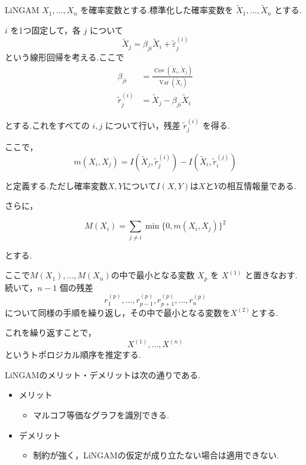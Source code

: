 \documentclass[uplatex, dvipdfmx]{jsarticle}
\begin{document}
\begin{defn}{LiNGAM}
  $X_1,\ldots,X_n$ を確率変数とする.標準化した確率変数を $\tilde X_1, \dots ,\tilde X_n$ とする.

  $i$ を1つ固定して，各 $j$ について
  \[
    \tilde X_j = \beta_{ji} \tilde X_i + \tilde \varepsilon_j^{(i)}
  \]
  という線形回帰を考える.ここで
  \begin{align}
    \beta_{ji} &= \frac{\operatorname{Cov}(\tilde X_i,\tilde X_j)}{\operatorname{Var}(\tilde X_i)} \\
    \tilde r_j^{(i)} &= \tilde X_j - \beta_{ji}\tilde X_i
  \end{align}

  とする.これをすべての $i,j$ について行い，残差 $\tilde r_j^{(i)}$ を得る.

  ここで，
  \[
    m(X_i,X_j) = I(\tilde X_j,\tilde r_j^{(i)}) - I(\tilde X_i,\tilde r_i^{(j)})
  \]

  と定義する.ただし確率変数$X,Y$について$I(X,Y)$は$X$と$Y$の相互情報量である.

  さらに，

  \[
    M(X_i) = \sum_{j \neq i} \min \{0,m(X_i,X_j)\}^2
  \]

  とする.

  ここで$M(X_1),\ldots,M(X_n)$の中で最小となる変数 $X_p$ を $X^{(1)}$ と置きなおす.
  続いて，$n-1$ 個の残差
  \[
    r_1^{(p)}, \ldots, r_{p-1}^{(p)}, r_{p+1}^{(p)}, \ldots, r_n^{(p)}
  \]
  について同様の手順を繰り返し，その中で最小となる変数を$X^{(2)}$とする.

  これを繰り返すことで，
  \[
    X^{(1)}, \ldots, X^{(n)}
  \]
  というトポロジカル順序を推定する.
\end{defn}


LiNGAMのメリット・デメリットは次の通りである.
\begin{itemize}
  \item メリット
    \begin{itemize}
      \item マルコフ等価なグラフを識別できる.  
    \end{itemize}

  \item デメリット
    \begin{itemize}
      \item 制約が強く，LiNGAMの仮定が成り立たない場合は適用できない.
    \end{itemize}
\end{itemize}
\end{document}
